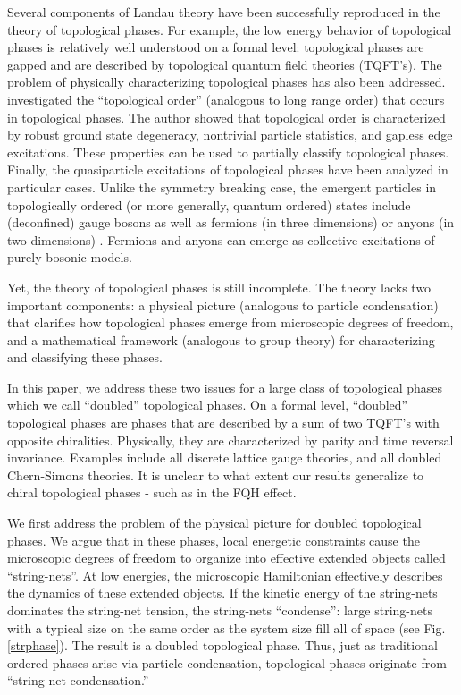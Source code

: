 \documentclass[aps,twocolumn,groupedaddress,showpacs,floatfix]{revtex4}
\begin{document}
Several components of Landau theory have been successfully reproduced in the
theory of topological phases. For example, the low energy behavior of
topological phases is relatively well understood on a formal level:
topological phases are gapped and are described by topological quantum field
theories (TQFT's).\cite{W8951} The problem of physically characterizing
topological phases has also been addressed.  investigated the
``topological order'' (analogous to long range order) that occurs in
topological phases. The author showed that topological order is characterized
by robust ground state degeneracy, nontrivial particle statistics, and gapless
edge excitations.\cite{Wrig,WNtop,Wedgerev} These properties can be used to
partially classify topological phases. Finally, the quasiparticle excitations
of topological phases have been analyzed in particular cases. Unlike the
symmetry breaking case, the emergent particles in topologically ordered (or
more generally, quantum ordered) states include (deconfined) gauge
bosons\cite{BMK7793,FNN8035} as well as  fermions (in three dimensions)
\cite{LWsta,Wqoem} or anyons (in two dimensions) \cite{ASW8422}. Fermions and
anyons can emerge as collective excitations of purely bosonic models.

Yet, the theory of topological phases is still incomplete. The theory 
lacks two important components: a physical picture (analogous to particle 
condensation) that clarifies how topological phases emerge from microscopic 
degrees of freedom, and a mathematical framework (analogous to group theory) 
for characterizing and classifying these phases.

In this paper, we address these two issues for a large class of topological
phases which we call ``doubled'' topological phases. On a formal level, 
``doubled'' topological phases are phases that are described by a sum of two 
TQFT's with opposite chiralities. Physically, they are characterized by parity 
and time reversal invariance. Examples include all discrete lattice gauge 
theories, and all doubled Chern-Simons theories. It is unclear to what extent 
our results generalize to chiral topological phases - such as in the FQH 
effect.

We first address the problem of the physical picture for doubled topological
phases. We argue that in these phases, local energetic constraints cause the
microscopic degrees of freedom to organize into effective extended objects
called ``string-nets''. At low energies, the microscopic Hamiltonian 
effectively describes the dynamics of these extended objects. If the kinetic 
energy of the string-nets dominates the string-net tension, the string-nets 
``condense'': large string-nets with a typical size on the same order as the 
system size fill all of space (see Fig. \ref{strphase}). The result is a 
doubled topological phase. Thus, just as traditional ordered phases arise via 
particle condensation, topological phases originate from ``string-net 
condensation.''
\end{document}
